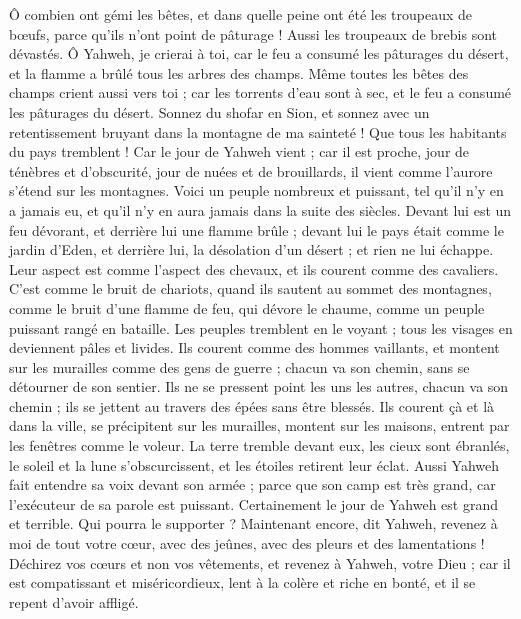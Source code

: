 \begin{multicols}{2}
Ô combien ont gémi les bêtes, et dans quelle peine ont été les troupeaux de bœufs, parce qu'ils n'ont point de pâturage ! Aussi les troupeaux de brebis sont dévastés.
Ô Yahweh, je crierai à toi, car le feu a consumé les pâturages du désert, et la flamme a brûlé tous les arbres des champs.
Même toutes les bêtes des champs crient aussi vers toi ; car les torrents d'eau sont à sec, et le feu a consumé les pâturages du désert.
\VerseOne{}Sonnez du shofar en Sion, et sonnez avec un retentissement bruyant dans la montagne de ma sainteté ! Que tous les habitants du pays tremblent ! Car le jour de Yahweh vient ; car il est proche,
jour de ténèbres et d'obscurité, jour de nuées et de brouillards, il vient comme l'aurore s'étend sur les montagnes. Voici un peuple nombreux et puissant, tel qu'il n'y en a jamais eu, et qu'il n'y en aura jamais dans la suite des siècles.
Devant lui est un feu dévorant, et derrière lui une flamme brûle ; devant lui le pays était comme le jardin d'Eden, et derrière lui, la désolation d'un désert ; et rien ne lui échappe. 
Leur aspect est comme l'aspect des chevaux, et ils courent comme des cavaliers.
C'est comme le bruit de chariots, quand ils sautent au sommet des montagnes, comme le bruit d'une flamme de feu, qui dévore le chaume, comme un peuple puissant rangé en bataille.
Les peuples tremblent en le voyant ; tous les visages en deviennent pâles et livides.
Ils courent comme des hommes vaillants, et montent sur les murailles comme des gens de guerre ; chacun va son chemin, sans se détourner de son sentier.
Ils ne se pressent point les uns les autres, chacun va son chemin ; ils se jettent au travers des épées sans être blessés.
Ils courent çà et là dans la ville, se précipitent sur les murailles, montent sur les maisons, entrent par les fenêtres comme le voleur.
La terre tremble devant eux, les cieux sont ébranlés, le soleil et la lune s'obscurcissent, et les étoiles retirent leur éclat.
Aussi Yahweh fait entendre sa voix devant son armée ; parce que son camp est très grand, car l'exécuteur de sa parole est puissant. Certainement le jour de Yahweh est grand et terrible. Qui pourra le supporter ?
Maintenant encore, dit Yahweh, revenez à moi de tout votre cœur, avec des jeûnes, avec des pleurs et des lamentations !
Déchirez vos cœurs et non vos vêtements, et revenez à Yahweh, votre Dieu ; car il est compatissant et miséricordieux, lent à la colère et riche en bonté, et il se repent d'avoir affligé.

\end{multicols}
